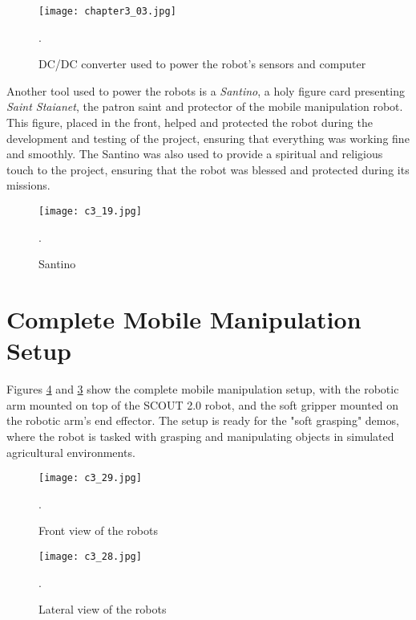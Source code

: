 \begin{figure}[t]
    \centering
    \texttt{[image: chapter3\_03.jpg]}
    \captionsetup{width=1\linewidth}
    \caption{DC/DC converter used to power the robot's sensors and computer}.
    \label{fig:c3_img03}
\end{figure}

Another tool used to power the robots is a \textit{Santino}, a holy figure card presenting \textit{Saint Staianet}, 
the patron saint and protector of the mobile manipulation robot. This figure, placed in the front,
helped and protected the robot during the development and testing of the project, ensuring that everything
was working fine and smoothly. The Santino was also used to provide a spiritual and religious touch to the project,
ensuring that the robot was blessed and protected during its missions.

\begin{figure}[t]
    \centering
    \texttt{[image: c3\_19.jpg]}
    \captionsetup{width=1\linewidth}
    \caption{Santino}.
    \label{fig:c3_img19}
\end{figure}

\section{Complete Mobile Manipulation Setup}

Figures \ref{fig:c3_img28} and \ref{fig:c3_img29} show the complete mobile manipulation setup, with the robotic arm
mounted on top of the SCOUT 2.0 robot, and the soft gripper mounted on the robotic arm's end effector.
The setup is ready for the "soft grasping" demos, where the robot is tasked with grasping and manipulating objects
in simulated agricultural environments.

\begin{figure}[t]
    \centering
    \texttt{[image: c3\_29.jpg]}
    \captionsetup{width=1\linewidth}
    \caption{Front view of the robots}.
    \label{fig:c3_img29}
\end{figure}

\begin{figure}[t]
    \centering
    \texttt{[image: c3\_28.jpg]}
    \captionsetup{width=1\linewidth}
    \caption{Lateral view of the robots}.
    \label{fig:c3_img28}
\end{figure}